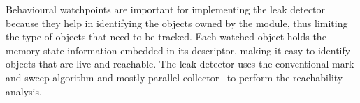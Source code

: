 \documentclass[letterpaper,twocolumn,10pt]{article}
\begin{document}
Behavioural watchpoints are important for implementing the leak detector because they help in identifying the objects owned by the module, thus limiting the type of objects that need to be tracked. Each watched object holds the memory state information embedded in its descriptor, making it easy to identify objects that are live and reachable. %
The leak detector uses the conventional mark and sweep algorithm and mostly-parallel collector~\cite{Boehm:1991:MPG:113445.113459} to perform the reachability analysis.












\end{document}
